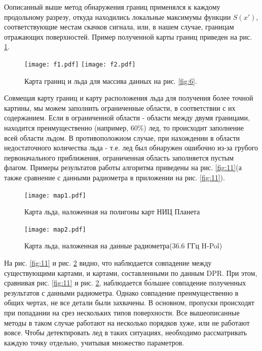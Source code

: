Оописанный выше метод обнаружения границ применялся к каждому продольному разрезу, откуда находились локальные
максимумы функции $S(x')$, соответствующие местам скачков сигнала, или, в нашем случае, границам отражающих
поверхностей. Пример полученной карты границ приведен на рис. \ref{fig:10}.

\begin{figure}[h!]
  \centering
  \texttt{[image: f1.pdf]}
  \texttt{[image: f2.pdf]}
  \caption{Карта границ и льда для массива данных на рис. \ref{fig:6}.}
  \label{fig:10}
\end{figure}

Совмещая карту границ и карту расположения льда для получения более точной картины, мы можем заполнить ограниченные
области, в соответствии с их содержанием. Если в ограниченной области - области между двумя границами, находится
преимущественно (например, 60\%) лед, то происходит заполнение всей
области льдом. В противоположном случае, при нахождении в области недостаточного количества льда - т.е. лед был
обнаружен ошибочно из-за грубого первоначального приближения, ограниченная область заполняется пустым флагом.
Примеры результатов работы алгоритма приведены на рис. \ref{fig:11}(а также сравнение с данными радиометра в приложении на рис. \ref{fig:11}).

\begin{figure}[h!]
  \centering
  \begin{minipage}{0.48\linewidth}
    \texttt{[image: map1.pdf]}
    \caption{Карта льда, наложенная на полигоны карт НИЦ Планета}
    \label{fig:11}
  \end{minipage}
  \begin{minipage}{0.51\linewidth}
    \texttt{[image: map2.pdf]}
    \caption{Карта льда, наложенная на данные радиометра(36.6 ГГц H-Pol)}
    \label{fig:12}
  \end{minipage}

\end{figure}

На рис. \ref{fig:11} и рис. \ref{fig:12} видно, что наблюдается совпадение между существующими картами, и картами, составленными
по данным DPR. При этом, сравнивая рис. \ref{fig:11} и рис. \ref{fig:12}, наблюдается б\'{о}льшее совпадение полученных
результатов с данными радиометра. Однако совпадение преимущественно в общих чертах, не все детали были захвачены. В основном,
пропуски происходят при попадании на срез нескольких типов поверхности. Все вышеописанные методы в таком случае работают на несколько порядков
хуже, или не работают вовсе. Чтобы детектировать лед в таких ситуациях, необходимо рассматривать каждую точку отдельно,
учитывая множество параметров.

